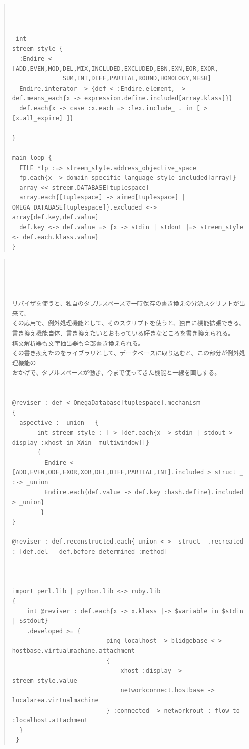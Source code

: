 \documentclass{jsarticle}
\begin{document}
\begin{quote}
\setlength{\baselineskip}{12pt}
\begin{verbatim}



 int 
streem_style {
  :Endire <- [ADD,EVEN,MOD,DEL,MIX,INCLUDED,EXCLUDED,EBN,EXN,EOR,EXOR,
              SUM,INT,DIFF,PARTIAL,ROUND,HOMOLOGY,MESH]
  Endire.interator -> {def < :Endire.element, -> def.means_each{x -> expression.define.included[array.klass]}}
  def.each{x -> case :x.each => :lex.include_ . in [ > [x.all_expire] ]}
  
}

main_loop {
  FILE *fp :=> streem_style.address_objective_space
  fp.each{x -> domain_specific_language_style_included[array]}
  array << streem.DATABASE[tuplespace]
  array.each{[tuplespace] -> aimed[tuplespace] | OMEGA_DATABASE[tuplespace]}.excluded <-> array[def.key,def.value]
  def.key <-> def.value => {x -> stdin | stdout |=> streem_style <- def.each.klass.value}
}

\end{verbatim}
\end{quote}

 
\begin{quote}
\setlength{\baselineskip}{12pt}
\begin{verbatim}

 
                      

リバイザを使うと、独自のタプルスペースで一時保存の書き換えの分派スクリプトが出来て、
その応用で、例外処理機能として、そのスクリプトを使うと、独自に機能拡張できる。
書き換え機能自体、書き換えたいとおもっている好きなところを書き換えられる。
構文解析器も文字抽出器も全部書き換えられる。
その書き換えたのをライブラリとして、データベースに取り込むと、この部分が例外処理機能の
おかげで、タプルスペースが働き、今まで使ってきた機能と一線を画しする。　


@reviser : def < OmegaDatabase[tuplespace].mechanism
{
  aspective : _union _ {
       int streem_style : [ > [def.each{x -> stdin | stdout > display :xhost in XWin -multiwindow]]}
       {
         Endire <- [ADD,EVEN,ODE,EXOR,XOR,DEL,DIFF,PARTIAL,INT].included > struct _ :-> _union
         Endire.each{def.value -> def.key :hash.define}.included > _union}
        }
}

@reviser : def.reconstructed.each{_union <-> _struct _.recreated : [def.del - def.before_determined :method]



import perl.lib | python.lib <-> ruby.lib
{
	int @reviser : def.each{x -> x.klass |-> $variable in $stdin | $stdout}
	.developed >= {
                          ping localhost -> blidgebase <-> hostbase.virtualmachine.attachment
                          {
                              xhost :display -> streem_style.value
                              networkconnect.hostbase -> localarea.virtualmachine 
                          } :connected -> networkrout : flow_to :localhost.attachment
  }
 } 
\end{verbatim}
\end{quote}
\end{document}
